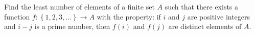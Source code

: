 Find the least number of elements of a finite set $A$ such that there exists a function $f : \left\{1,2,3,\ldots \right\}\rightarrow A$ with the property: if $i$ and $j$ are positive integers and $i-j$ is a prime number, then $f(i)$ and $f(j)$ are distinct elements of $A$.
